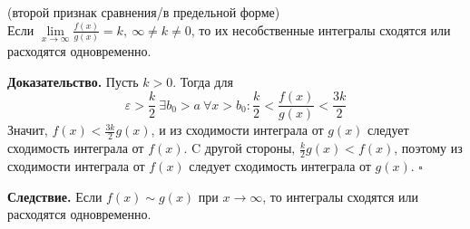 \begin{theor} (второй признак сравнения/в предельной форме)\\
Если $\lim\limits_{x \to \infty}\frac{f(x)}{g(x)}=k,~\infty\ne k\ne0$, 
то их несобственные интегралы сходятся или расходятся одновременно. 
\end{theor}
\textbf{Доказательство.} Пусть $k>0$. Тогда для
 $$\varepsilon>\frac{k}{2}~\exists b_0>a~\forall x>b_0:\frac{k}{2}<
 \frac{f(x)}{g(x)}<\frac{3k}{2}$$ 
Значит, $f(x)< \frac{3k}{2}g(x)$, и из сходимости интеграла от $g(x)$ следует
сходимость интеграла от $f(x)$. C другой стороны, $\frac{k}{2}g(x)<f(x)$, 
поэтому из сходимости интеграла от $f(x)$ следует сходимость интеграла от 
$g(x)$. $\square$ 

\textbf{Следствие.} Если $f(x)\sim g(x)$ при $x\to \infty$, то интегралы 
сходятся или расходятся одновременно. 




















